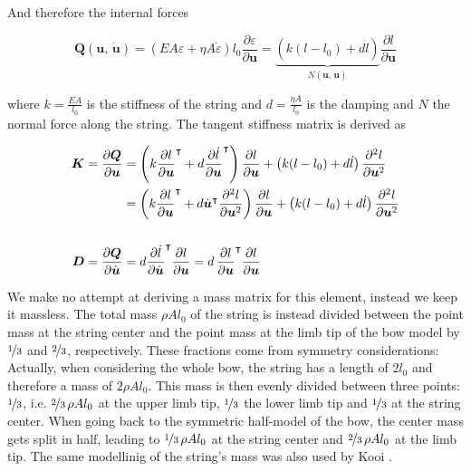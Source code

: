 And therefore the internal forces

\begin{equation}
\boldsymbol{Q}(\boldsymbol{u},\,\dot{\boldsymbol{u}}) = \left(EA\varepsilon + \eta A\dot{\varepsilon}\right)l_{0}\frac{\partial\varepsilon}{\partial\boldsymbol{u}} = \underbrace{\left(k(l - l_{0}) + d\dot{l}\right)}_{N(\boldsymbol{u},\,\dot{\boldsymbol{u}})}\frac{\partial l}{\partial\boldsymbol{u}}
\end{equation}

where $k = \frac{EA}{l_{0}}$ is the stiffness of the string and $d = \frac{\eta A}{l_{0}}$ is the damping and $N$ the normal force along the string.
The tangent stiffness matrix is derived as

\begin{align}
\boldsymbol{K} = \frac{\partial\boldsymbol{Q}}{\partial\boldsymbol{u}} &= \left(k\frac{\partial l}{\partial\boldsymbol{u}}^\intercal + d\frac{\partial\dot{l}}{\partial\boldsymbol{u}}^\intercal\right)\frac{\partial l}{\partial\boldsymbol{u}} + \left(k(l - l_{0}) + d\dot{l}\right)\frac{\partial^2 l}{\partial\boldsymbol{u}^2} \notag \\
&= \left(k\frac{\partial l}{\partial\boldsymbol{u}}^\intercal + d\dot{\boldsymbol{u}}^\intercal\frac{\partial^2 l}{\partial\boldsymbol{u}^2}\right)\frac{\partial l}{\partial\boldsymbol{u}} + \left(k(l - l_{0}) + d\dot{l}\right)\frac{\partial^2 l}{\partial\boldsymbol{u}^2} \\
\notag \\
\boldsymbol{D} = \frac{\partial\boldsymbol{Q}}{\partial\dot{\boldsymbol{u}}} &= d\frac{\partial\dot{l}}{\partial\dot{\boldsymbol{u}}}^\intercal\frac{\partial l}{\partial\boldsymbol{u}} = d\,\frac{\partial l}{\partial\boldsymbol{u}}^\intercal\frac{\partial l}{\partial\boldsymbol{u}}
\end{align}

We make no attempt at deriving a mass matrix for this element, instead we keep it massless.
The total mass $\rho A l_{0}$ of the string is instead divided between the point mass at the string center and the point mass at the limb tip of the bow model by $\nicefrac{1}{3}$ and $\nicefrac{2}{3}$, respectively.
These fractions come from symmetry considerations: Actually, when considering the whole bow, the string has a length of $2l_{0}$ and therefore a mass of $2\rho A l_{0}$.
This mass is then evenly divided between three points: $\nicefrac{1}{3}$, i.e. $\nicefrac{2}{3}\,\rho A l_{0}$ at the upper limb tip, $\nicefrac{1}{3}$ the lower limb tip and $\nicefrac{1}{3}$ at the string center.
When going back to the symmetric half-model of the bow, the center mass gets split in half, leading to $\nicefrac{1}{3}\,\rho A l_{0}$ at the string center and $\nicefrac{2}{3}\,\rho A l_{0}$ at the limb tip.
The same modellinig of the string's mass was also used by Kooi \cite{bib:kooi81}.


